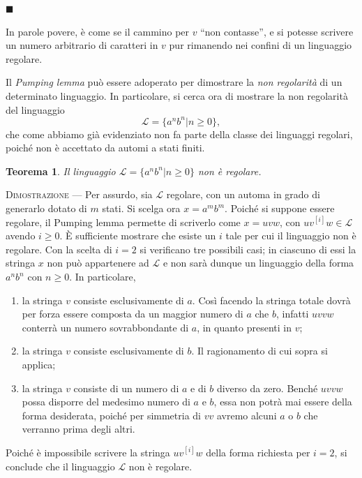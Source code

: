 \documentclass[10pt]{\classname}
\theoremstyle{newlinethm}
\newtheorem{thm}{Teorema}[section]
\theoremstyle{theorem}
\theoremstyle{definition}
\theoremstyle{definition}
\theoremstyle{definition}
\theoremstyle{definition}
\begin{document}
\begin{flushright}
$\blacksquare$
\end{flushright}

In parole povere, è come se il cammino per $v$ ``non contasse'', e si potesse
scrivere un numero arbitrario di caratteri in $v$ pur rimanendo nei confini di
un linguaggio regolare. 

Il \emph{Pumping lemma} può essere adoperato per
dimostrare la \emph{non regolarità} di un determinato linguaggio. In
particolare, si cerca ora di mostrare la non regolarità del linguaggio \[\mathcal
L = \{a^n b^n | n \geq 0\},\] che come abbiamo già evidenziato non fa parte della classe dei linguaggi regolari, poiché non è accettato da automi a stati finiti.

\begin{thm}
    Il linguaggio $\mathcal L =\{a^n b^n | n \geq 0\}$ non è regolare.
\end{thm}

\textsc{Dimostrazione } --- Per assurdo, sia $\mathcal L$ regolare, con un automa in grado di generarlo
dotato di $m$ stati. Si scelga ora $x = a^m b^m$. Poiché si suppone essere regolare, il Pumping
lemma permette di scriverlo come $x = uvw$, con $uv^{[i]}w \in \mathcal L$
avendo $i \geq 0$. È sufficiente mostrare che esiste un $i$ tale per cui il linguaggio non è regolare. Con la scelta di $i=2$ si verificano tre possibili casi; in
ciascuno di essi la stringa $x$ non può appartenere ad $\mathcal L$ e non sarà
dunque un linguaggio della forma $a^n b^n$ con $n \geq 0$. In particolare,

\begin{enumerate}
    \item la stringa $v$ consiste esclusivamente di $a$. Così facendo la stringa totale dovrà per forza essere composta da un maggior numero di $a$ che $b$, infatti $uvvw$ conterrà un numero sovrabbondante di $a$, in quanto presenti in $v$;
    \item la stringa $v$ consiste esclusivamente di $b$. Il ragionamento di cui sopra si applica;
    \item la stringa $v$ consiste di un numero di $a$ e di $b$ diverso da zero. Benché $uvvw$ possa disporre del medesimo numero di $a$ e $b$, essa non potrà mai essere della forma desiderata, poiché per simmetria di $vv$ avremo alcuni $a$ o $b$ che verranno prima degli altri.
\end{enumerate}

Poiché è impossibile scrivere la stringa $uv^{[i]}w$ della forma richiesta per $i = 2$, si conclude che il linguaggio $\mathcal L$ non è regolare.
\end{document}
